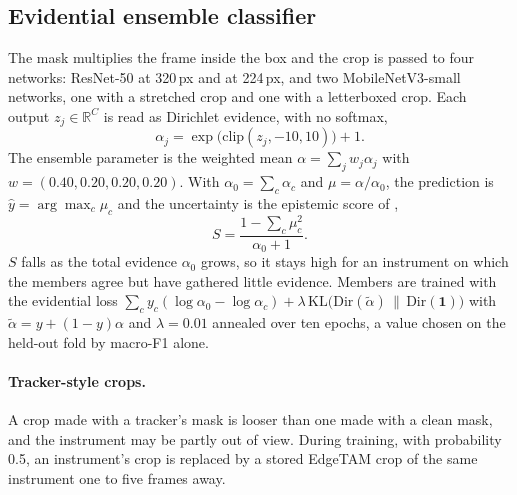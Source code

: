 \subsection{Evidential ensemble classifier}
The mask multiplies the frame inside the box and the crop is passed to four networks: ResNet-50 at 320\,px and at 224\,px, and two MobileNetV3-small networks, one with a stretched crop and one with a letterboxed crop.
Each output $z_j \in \mathbb{R}^C$ is read as Dirichlet evidence, with no softmax,
\begin{equation}
\alpha_j = \exp\!\big(\mathrm{clip}(z_j,-10,10)\big) + 1.
\label{eq:alpha}
\end{equation}
The ensemble parameter is the weighted mean $\alpha = \sum_j w_j \alpha_j$ with $w = (0.40, 0.20, 0.20, 0.20)$.
With $\alpha_0=\sum_c \alpha_c$ and $\mu = \alpha/\alpha_0$, the prediction is $\hat{y}=\arg\max_c \mu_c$ and the uncertainty is the epistemic score of \citet{duan2024evidential},
\begin{equation}
S = \frac{1 - \sum_c \mu_c^2}{\alpha_0 + 1}.
\label{eq:score}
\end{equation}
$S$ falls as the total evidence $\alpha_0$ grows, so it stays high for an instrument on which the members agree but have gathered little evidence.
Members are trained with the evidential loss $\sum_c y_c(\log\alpha_0 - \log\alpha_c) + \lambda\,\mathrm{KL}\big(\mathrm{Dir}(\tilde{\alpha})\,\|\,\mathrm{Dir}(\mathbf{1})\big)$ with $\tilde{\alpha}=y+(1-y)\alpha$ and $\lambda=0.01$ annealed over ten epochs, a value chosen on the held-out fold by macro-F1 alone.

\paragraph{Tracker-style crops.}
A crop made with a tracker's mask is looser than one made with a clean mask, and the instrument may be partly out of view.
During training, with probability 0.5, an instrument's crop is replaced by a stored EdgeTAM crop of the same instrument one to five frames away.

